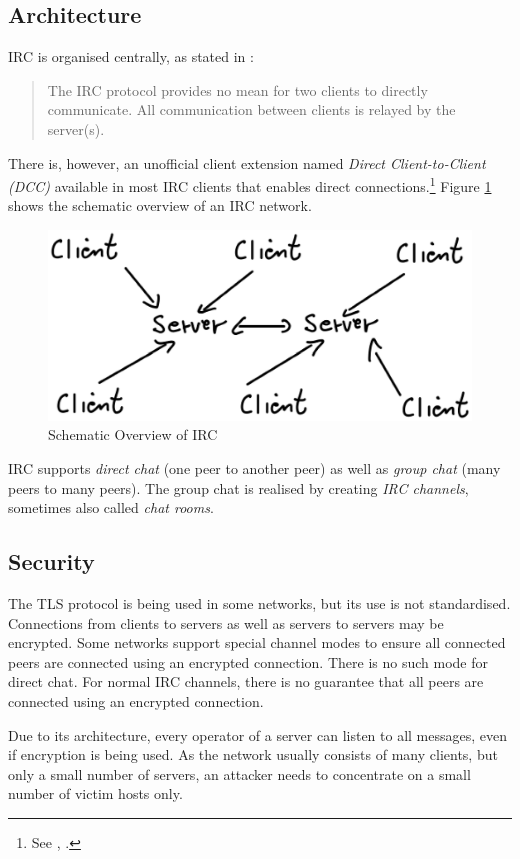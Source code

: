 \subsection{Architecture}
IRC is organised centrally, as stated in \cite{rfc2810}:
\begin{quote}
The IRC protocol provides no mean for two clients to directly
communicate.  All communication between clients is relayed by the
server(s).
\end{quote}
There is, however, an unofficial client extension named 
\textit{Direct Client-to-Client (DCC)} available in most IRC clients
that enables direct connections.\footnote{See \cite{dcc}, \cite{ctcp}.}
Figure \ref{ircoverview} shows the schematic overview of an IRC network.
\begin{figure}
    \caption{Schematic Overview of IRC}
    \label{ircoverview}
    \centering
    
    \includegraphics{irc.eps}
\end{figure}
IRC supports 
\textit{direct chat} (one peer to another peer) as well 
as \textit{group chat} (many peers to many peers). The group chat is
realised by creating \textit{IRC channels}, sometimes also called 
\textit{chat rooms}.
\subsection{Security}
The TLS protocol \cite{rfc2246} is being used in some networks,
but its use is not standardised. Connections from clients to servers
as well as servers to servers may be encrypted.
Some networks support special channel modes to ensure all connected peers
are connected using an encrypted connection. There is no such mode for
direct chat. For normal IRC channels, there is no guarantee that all
peers are connected using an encrypted connection.

Due to its architecture, every operator of a server can listen to all
messages, even if encryption is being used. As the network usually consists
of many clients, but only a small number of servers, an attacker needs
to concentrate on a small number of victim hosts only.

